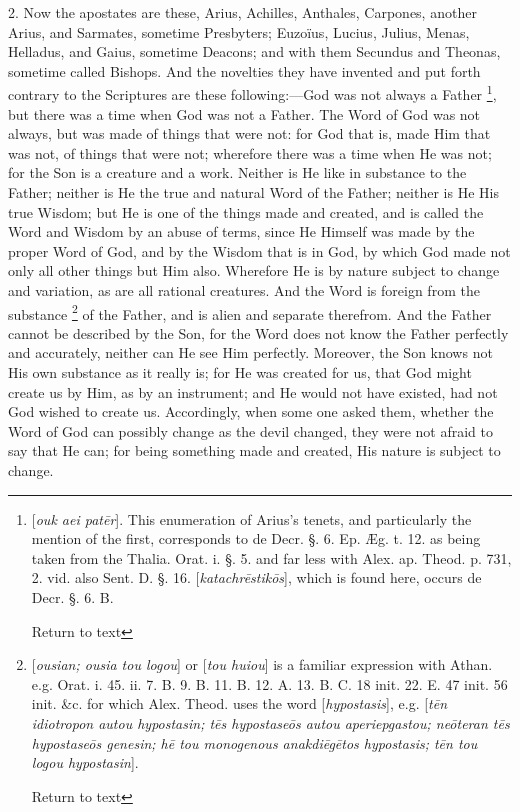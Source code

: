 2. Now the apostates are these, Arius, Achilles,
Anthales, Carpones, another Arius, and Sarmates, sometime Presbyters;
Euzoïus, Lucius, Julius, Menas, Helladus, and Gaius, sometime
Deacons; and with them Secundus and Theonas, sometime called Bishops.
And the novelties they have invented and put forth contrary to the
Scriptures are these following:—God was not always a Father \footnote{[\emph{ouk aei pat\={e}r}]. This enumeration of Arius's tenets, and
particularly the mention of the first, corresponds to de Decr. §. 6.
Ep. Æg. t. 12. as being taken from the Thalia. Orat. i. §. 5. and
far less with Alex. ap. Theod. p. 731, 2. vid. also Sent. D. §. 16. [\emph{katachr\={e}stik\={o}s}],
which is found here, occurs de Decr. §. 6. B.

Return to text}, but there was a time when God was not a Father. The Word of
God was not always, but was made of things that were not: for God that
is, made Him that was not, of things that were not; wherefore there
was a time when He was not; for the Son is a creature and a work.
Neither is He like in substance to the Father; neither is He the true
and natural Word of the Father; neither is He His true Wisdom; but He
is one of the things made and created, and is called the Word and
Wisdom by an abuse of terms, since He Himself was made by the proper
Word of God, and by the Wisdom that is in God, by which God made not
only all other things but Him also. Wherefore He is by nature subject
to change and variation, as are all rational creatures. And the Word
is foreign from the substance \footnote{[\emph{ousian; ousia tou logou}] or [\emph{tou huiou}] is a familiar
expression with Athan. e.g. Orat. i. 45. ii. 7. B. 9. B. 11. B. 12. A.
13. B. C. 18 init. 22. E. 47 init. 56 init. \&c. for which Alex.
Theod. uses the word [\emph{hypostasis}], e.g. [\emph{t\={e}n
idiotropon autou hypostasin; t\={e}s hypostase\={o}s autou
aperiepgastou; ne\={o}teran t\={e}s hypostase\={o}s genesin;
h\={e} tou monogenous anakdi\={e}g\={e}tos hypostasis; t\={e}n
tou logou hypostasin}].

Return to text}
of the Father, and is alien and separate therefrom. And the Father
cannot be described by the Son, for the Word does not know the Father
perfectly and accurately, neither can He see Him perfectly. Moreover,
the Son knows not His own substance as it really is; for He was
created for us, that God might create us by Him, as by an instrument;
and He would not have existed, had not God wished to create us.
Accordingly, when some one asked them, whether the Word of God can
possibly change as the devil changed, they were not afraid to say that
He can; for being something made and created, His nature is subject to
change.

